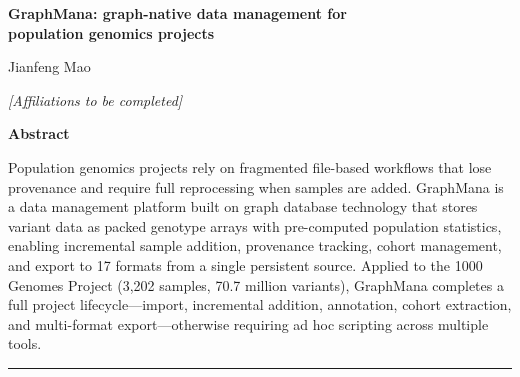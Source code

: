 \documentclass[11pt,a4paper]{article}
\begin{document}
\begin{center}
{\LARGE\bfseries\color{titleblue} GraphMana: graph-native data management for\\[4pt] population genomics projects}

\vspace{12pt}
{\large Jianfeng Mao}

\vspace{6pt}
{\small\itshape [Affiliations to be completed]}
\end{center}

\vspace{10pt}

\noindent\textbf{Abstract}

\noindent
Population genomics projects rely on fragmented file-based workflows that lose provenance and require full reprocessing when samples are added. GraphMana is a data management platform built on graph database technology that stores variant data as packed genotype arrays with pre-computed population statistics, enabling incremental sample addition, provenance tracking, cohort management, and export to 17 formats from a single persistent source. Applied to the 1000 Genomes Project (3,202 samples, 70.7 million variants), GraphMana completes a full project lifecycle---import, incremental addition, annotation, cohort extraction, and multi-format export---otherwise requiring ad hoc scripting across multiple tools.

\vspace{6pt}
\noindent\rule{\textwidth}{0.4pt}
\vspace{6pt}

\end{document}
